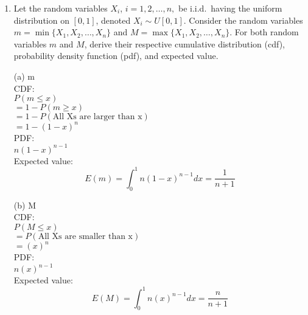 \documentclass[letterpaper,12pt]{article}
\theoremstyle{definition}
\begin{document}
\begin{enumerate}
	\item Let the random variables $X_i$, $i=1,2,\ldots,n,$ be i.i.d.\ having the uniform distribution on $[0,1]$, denoted $X_i \sim U[0,1]$. Consider the random variables $m=\min\{X_1,X_2,\ldots,X_n\}$ and $M=\max\{X_1,X_2,\ldots,X_n\}$. For both random variables $m$ and $M$, derive their respective cumulative distribution (cdf), probability density function (pdf), and expected value.\\
			\item[(a)] m\\
			CDF:\\
			$P(m \leq x)$\\
			$= 1 - P(m \geq x)$\\
			$= 1 - P(\text{All Xs are larger than x})$\\
			$= 1 - (1 - x)^n$\\
			PDF:\\
			$n(1 - x)^{n - 1}$\\
			Expected value: \\
			$$E(m) = \int_{0}^{1} n(1 - x)^{n - 1} dx = \frac{1}{n + 1}$$
			\item[(b)] M\\
			CDF:\\
			$P(M \leq x)$\\
			$=  P(\text{All Xs are smaller than x})$\\
			$= (x)^n$\\
			PDF:\\
			$n(x)^{n - 1}$\\
			Expected value: \\
			$$E(M) = \int_{0}^{1} n(x)^{n - 1} dx = \frac{n}{n + 1}$$



\end{enumerate}
\end{document}
